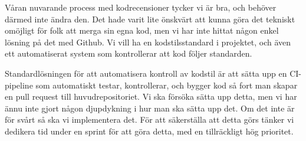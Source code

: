 \documentclass{scrartcl}
\begin{document}
Våran nuvarande process med kodrecensioner tycker vi är bra, och behöver därmed inte ändra den.
Det hade varit lite önskvärt att kunna göra det tekniskt omöjligt för folk att merga sin egna kod, men vi har inte hittat någon enkel lösning på det med Github.
Vi vill ha en kodstilsstandard i projektet, och även ett automatiserat system som kontrollerar att kod följer standarden.

Standardlösningen för att automatisera kontroll av kodstil är att sätta upp en CI-pipeline som automatiskt testar, kontrollerar, och bygger kod så fort man skapar en pull request till huvudrepositoriet.
Vi ska försöka sätta upp detta, men vi har ännu inte gjort någon djupdykning i hur man ska sätta upp det.
Om det inte är för svårt så ska vi implementera det.
För att säkerställa att detta görs tänker vi dedikera tid under en sprint för att göra detta, med en tillräckligt hög prioritet.
\end{document}
